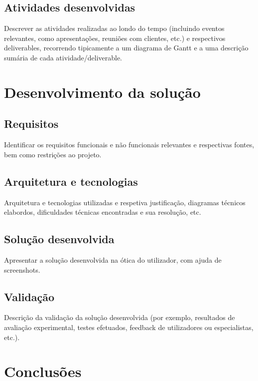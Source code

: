 \documentclass[10pt]{article}
\begin{document}
\subsection{Atividades desenvolvidas}

Descrever as atividades realizadas ao londo do tempo (incluindo eventos relevantes, como apresentações, reuniões com clientes, etc.) e respectivos deliverables, recorrendo tipicamente a um diagrama de Gantt\cite{gantt} e a uma descrição sumária de cada atividade/deliverable. 


\section{Desenvolvimento da solução}

\subsection{Requisitos}

Identificar os requisitos funcionais e não funcionais relevantes e respectivas fontes, bem como restrições ao projeto.

\subsection{Arquitetura e tecnologias}

Arquitetura e tecnologias utilizadas e respetiva justificação, diagramas técnicos elabordos, dificuldades técnicas encontradas e sua resolução, etc.

\subsection{Solução desenvolvida}

Apresentar a solução desenvolvida na ótica do utilizador, com ajuda de screenshots.

\subsection{Validação}

Descrição da validação da solução desenvolvida (por exemplo, resultados de avaliação experimental, testes efetuados, feedback de utilizadores ou especialistas, etc.).


\section{Conclusões}
\end{document}
